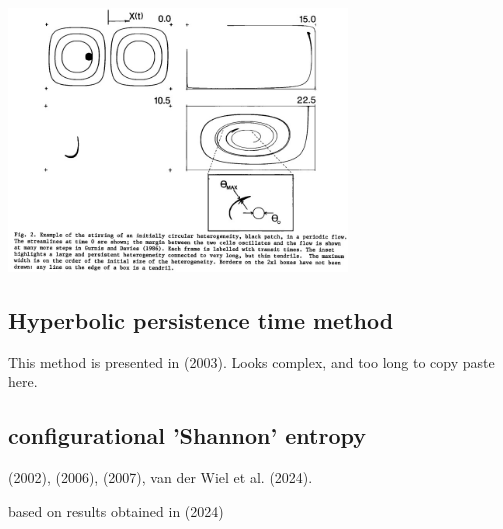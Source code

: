 \begin{center}
\includegraphics[width=9cm]{images/mixing/gurn86}
\end{center}

\subsection{Hyperbolic persistence time method}

This method is presented in \textcite{fasa03} (2003).
Looks complex, and too long to copy paste here.



\subsection{configurational 'Shannon' entropy}

\textcite{gobo02} (2002), 
\textcite{cakm06} (2006),
\textcite{nake07} (2007), 
van der Wiel et al. (2024). 

based on results obtained in \textcite{vavt24} (2024)

\textcite{pedp15}
\textcite{bipe18}


